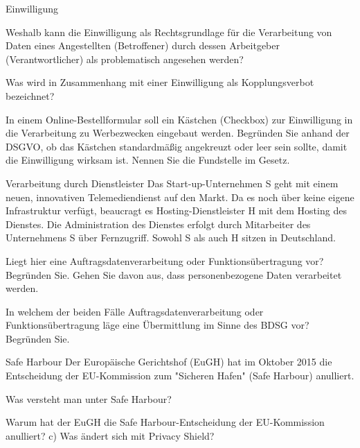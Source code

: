 \documentclass{exercisesheet}
\begin{document}

\begin{exercise**}{Einwilligung}
  \item Weshalb kann die Einwilligung als Rechtsgrundlage für die Verarbeitung von Daten eines Angestellten (Betroffener) durch dessen Arbeitgeber (Verantwortlicher) als problematisch angesehen werden?
  \item Was wird in Zusammenhang mit einer Einwilligung als Kopplungsverbot bezeichnet?
  \item In einem Online-Bestellformular soll ein Kästchen (Checkbox) zur Einwilligung in die Verarbeitung zu Werbezwecken eingebaut werden. Begründen Sie anhand der DSGVO, ob das Kästchen standardmäßig angekreuzt oder leer sein sollte, damit die Einwilligung wirksam ist. Nennen Sie die Fundstelle im Gesetz.
\end{exercise**}

\begin{exercise*}{Verarbeitung durch Dienstleister}{
    Das Start-up-Unternehmen S geht mit einem neuen, innovativen Telemediendienst auf den Markt. Da es noch über keine eigene Infrastruktur verfügt, beaucragt es Hosting-Dienstleister H mit dem Hosting des Dienstes. Die Administration des Dienstes erfolgt durch Mitarbeiter des Unternehmens S über Fernzugriff. Sowohl S als auch H sitzen in Deutschland.
  }
  \item Liegt hier eine Auftragsdatenverarbeitung oder Funktionsübertragung vor? Begründen Sie. Gehen Sie davon aus, dass personenbezogene Daten verarbeitet werden.
  \item In welchem der beiden Fälle Auftragsdatenverarbeitung oder Funktionsübertragung läge eine Übermittlung im Sinne des BDSG vor? Begründen Sie.
\end{exercise*}


\begin{exercise*}{Safe Harbour}{
    Der Europäische Gerichtshof (EuGH) hat im Oktober 2015 die Entscheidung der EU-Kommission zum "Sicheren Hafen" (Safe Harbour) anulliert.
  }
  \item Was versteht man unter Safe Harbour?
  \item Warum hat der EuGH die Safe Harbour-Entscheidung der EU-Kommission anulliert? c) Was ändert sich mit Privacy Shield?
\end{exercise*}
\end{document}
